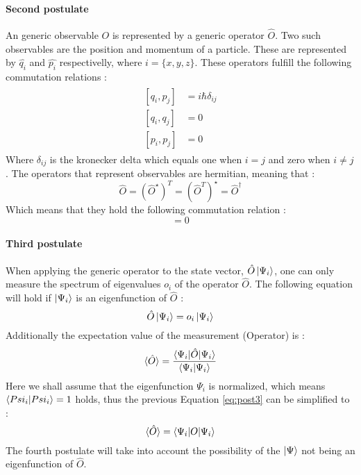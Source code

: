 \documentclass[../master_thesis.tex]{subfiles}
\begin{document}
\paragraph{Second postulate}
An generic observable $O$ is represented by a generic operator $\hat{O}$. Two
such observables are the position and momentum of a particle. These are
represented by $\hat{q_i}$ and $\hat{p_i}$ respectivelly, where
$i = \{x, y, z\}$. These operators fulfill the following commutation relations
\cite{Atkins:2011, Cohen:1973}:
\begin{align}
  \begin{split}
    [q_i, p_j] &= i \hbar \delta_{ij}\\
    [q_i, q_j] &= 0 \\
    [p_i, p_j] &= 0
  \end{split}
\end{align}
Where $\delta_{ij}$ is the kronecker delta which equals one when $i = j$ and
zero when $ i \neq j$ \cite{ Atkins:2014, Atkins:2011, Cohen:1973, Cramer:2004, Jensen:2017}.
The operators that represent observables are hermitian, meaning that
\cite{Cohen:1973}:
\begin{equation}
  \hat{O} = (\hat{O}^{\star})^T = (\hat{O}^T)^{\star} = \hat{O}^{\dagger}
\end{equation}
Which means that they hold the following commutation relation
\cite{Cohen:1973}:
\begin{equation}
  [\hat{O}, \hat{O}^{\dagger}] = 0
\end{equation}

\paragraph{Third postulate}
When applying the generic operator to the state vector, $\hat{O}\ket{\Psi_i}$,
one can only measure the spectrum of eigenvalues $o_i$ of the operator $\hat{O}$. The
following equation will hold if $\ket{\Psi_i}$ is an eigenfunction of $\hat{O}$
\cite{Cohen:1973, Atkins:2014}:
\begin{equation}
  \hat{O}\ket{\Psi_i} = o_i\ket{\Psi_i}
\end{equation}
Additionally the expectation value of the measurement (Operator) is
\cite{Atkins:2011}:
\begin{equation}\label{eq:post3}
  \braket{\hat{O}} = \frac{\braket{\Psi_i|\hat{O}|\Psi_i}}{\braket{\Psi_i|\Psi_i}}
\end{equation}
Here we shall assume that the eigenfunction $\Psi_i$ is normalized, which means
$\braket{Psi_i|Psi_i} = 1$ holds, thus the previous Equation \ref{eq:post3} can
be simplified to \cite{Atkins:2011}:
\begin{equation}
  \braket{\hat{O}} = \braket{\Psi_i|O|\Psi_i}
\end{equation}
The fourth postulate will take into account the possibility of the $\ket{\Psi}$
not being an eigenfunction of $\hat{O}$.
\end{document}
